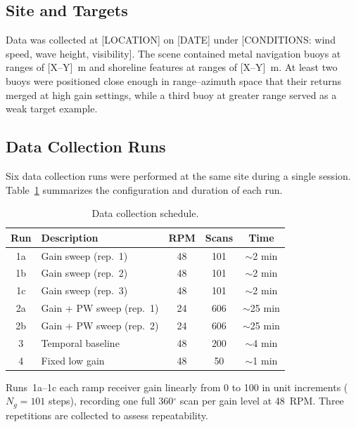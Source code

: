 \documentclass[colorlinks,upint,balance]{asmeconf}
\begin{document}
\subsection{Site and Targets}


Data was collected at [LOCATION] on [DATE] under [CONDITIONS: wind speed, wave height, visibility]. The scene contained metal navigation buoys at ranges of [X--Y]~m and shoreline features at ranges of [X--Y]~m. At least two buoys were positioned close enough in range--azimuth space that their returns merged at high gain settings, while a third buoy at greater range served as a weak target example.


\subsection{Data Collection Runs}

Six data collection runs were performed at the same site during a single session. Table~\ref{tab:runs} summarizes the configuration and duration of each run.

\begin{table}[t]
\caption{Data collection schedule.}
\label{tab:runs}
\centering
\begin{tabular}{c l c c c}
\toprule
\textbf{Run} & \textbf{Description} & \textbf{RPM} & \textbf{Scans} & \textbf{Time} \\
\midrule
1a & Gain sweep (rep.\ 1) & 48 & 101 & $\sim$2 min \\
1b & Gain sweep (rep.\ 2) & 48 & 101 & $\sim$2 min \\
1c & Gain sweep (rep.\ 3) & 48 & 101 & $\sim$2 min \\
2a & Gain + PW sweep (rep.\ 1) & 24 & 606 & $\sim$25 min \\
2b & Gain + PW sweep (rep.\ 2) & 24 & 606 & $\sim$25 min \\
3\phantom{a} & Temporal baseline & 48 & 200 & $\sim$4 min \\
4\phantom{a} & Fixed low gain & 48 & 50 & $\sim$1 min \\
\bottomrule
\end{tabular}
\end{table}

Runs~1a--1c each ramp receiver gain linearly from 0 to 100 in unit increments ($N_g = 101$ steps), recording one full 360$^\circ$ scan per gain level at 48~RPM. Three repetitions are collected to assess repeatability.
\end{document}
